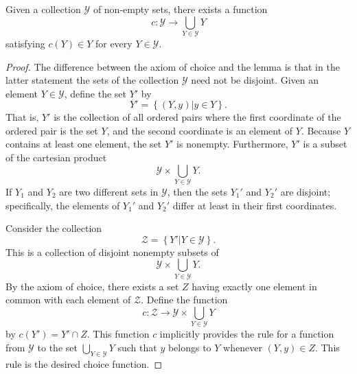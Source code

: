 \begin{lemma}
Given a collection $\mathcal{Y}$ of non-empty sets, there exists a function
\begin{equation*}
c: \mathcal{Y}  \rightarrow \bigcup_{Y \in \mathcal{Y}} Y
\end{equation*}
satisfying $c(Y) \in Y$ for every $Y \in \mathcal{Y}$.
\end{lemma}
\begin{proof}
The difference between the axiom of choice and the lemma is that in the latter statement the sets of the collection $\mathcal{Y}$ need not be disjoint.
Given an element $Y \in \mathcal{Y}$, define the set $Y'$ by
\begin{equation*}
Y' = \left\{ \left( Y, y \right) | y \in Y \right\}.
\end{equation*}
That is, $Y'$ is the collection of all ordered pairs where the first coordinate of the ordered pair is the set $Y$, and the second coordinate is an element of $Y$.
Because $Y$ contains at least one element, the set $Y'$ is nonempty.
Furthermore, $Y'$ is a subset of the cartesian product
\begin{equation*}
\mathcal{Y} \times \bigcup_{Y \in \mathcal{Y}} Y.
\end{equation*}
If $Y_1$ and $Y_2$ are two different sets in $\mathcal{Y}$, then the sets $Y_1'$ and $Y_2'$ are disjoint; specifically, the elements of $Y_1'$ and $Y_2'$ differ at least in their first coordinates.

Consider the collection
\begin{equation*}
\mathcal{Z} = \left\{ Y' | Y \in \mathcal{Y} \right\}.
\end{equation*}
This is a collection of disjoint nonempty subsets of
\begin{equation*}
\mathcal{Y} \times \bigcup_{Y \in \mathcal{Y}} Y.
\end{equation*}
By the axiom of choice, there exists a set $Z$ having exactly one element in common with each element of $\mathcal{Z}$.
Define the function
\begin{equation*}
c: \mathcal{Z} \rightarrow
\mathcal{Y} \times \bigcup_{Y \in \mathcal{Y}} Y
\end{equation*}
by $c \left( Y' \right) = Y' \cap Z$.
This function $c$ implicitly provides the rule for a function from $\mathcal{Y}$ to the set $\bigcup_{Y \in \mathcal{Y}} Y$ such that $y$ belongs to $Y$ whenever $\left( Y, y \right) \in Z$.
This rule is the desired choice function.
\end{proof}


